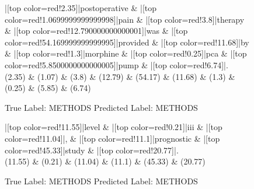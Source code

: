 \documentclass[a4paper, landscape]{article}
\begin{document}
\clearpage
\begin{figure}
\begin{center}
\begin{dependency}
\begin{deptext}
|[top color=red!2.35]|postoperative \& |[top color=red!1.0699999999999998]|pain \& |[top color=red!3.8]|therapy \& |[top color=red!12.790000000000001]|was \& |[top color=red!54.169999999999995]|provided \& |[top color=red!11.68]|by \& |[top color=red!1.3]|morphine \& |[top color=red!0.25]|pca \& |[top color=red!5.8500000000000005]|pump \& |[top color=red!6.74]|.\\
(2.35) \& (1.07) \& (3.8) \& (12.79) \& (54.17) \& (11.68) \& (1.3) \& (0.25) \& (5.85) \& (6.74)\\
\end{deptext}
\end{dependency}
\end{center}
\caption{True Label: METHODS Predicted Label: METHODS}
\end{figure}
\clearpage
\begin{figure}
\begin{center}
\begin{dependency}
\begin{deptext}
|[top color=red!11.55]|level \& |[top color=red!0.21]|iii \& |[top color=red!11.04]|, \& |[top color=red!11.1]|prognostic \& |[top color=red!45.33]|study \& |[top color=red!20.77]|.\\
(11.55) \& (0.21) \& (11.04) \& (11.1) \& (45.33) \& (20.77)\\
\end{deptext}
\end{dependency}
\end{center}
\caption{True Label: METHODS Predicted Label: METHODS}
\end{figure}
\clearpage
\end{document}
